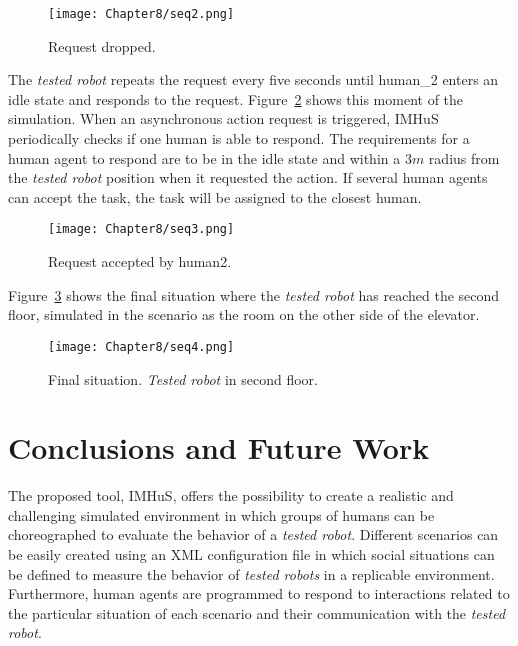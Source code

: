 \begin{figure}[!ht]
  \centering
  {\texttt{[image: Chapter8/seq2.png]}}
  \caption{Request dropped.}
  \label{fig:take_elevator_video_2}
\end{figure}

The \textit{tested robot} repeats the request every five seconds until human\_2 enters an idle state and responds to the request. Figure~\ref{fig:take_elevator_video_3} shows this moment of the simulation. When an asynchronous action request is triggered, IMHuS periodically checks if one human is able to respond. The requirements for a human agent to respond are to be in the idle state and within a $3m$ radius from the \textit{tested robot} position when it requested the action. If several human agents can accept the task, the task will be assigned to the closest human.

\begin{figure}[!ht]
  \centering
  {\texttt{[image: Chapter8/seq3.png]}}\\
  \caption{Request accepted by human2.}
  \label{fig:take_elevator_video_3}
\end{figure}

Figure~\ref{fig:take_elevator_video_4} shows the final situation where the \textit{tested robot} has reached the second floor, simulated in the scenario as the room on the other side of the elevator.

\begin{figure}[!ht]
  \centering
  {\texttt{[image: Chapter8/seq4.png]}}\\
  \caption{Final situation. \textit{Tested robot} in second floor.}
  \label{fig:take_elevator_video_4}
\end{figure}

\section{Conclusions and Future Work}
\label{sec:conclusions}

The proposed tool, IMHuS, offers the possibility to create a realistic and challenging simulated environment in which groups of humans can be choreographed to evaluate the behavior of a \textit{tested robot}. Different scenarios can be easily created using an XML configuration file in which social situations can be defined to measure the behavior of \textit{tested robots} in a replicable environment. Furthermore, human agents are programmed to respond to interactions related to the particular situation of each scenario and their communication with the \textit{tested robot}. 


